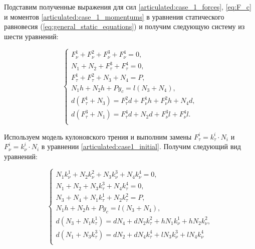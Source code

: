 Подставим полученные выражения для сил \ref{articulated:case_1_forces}, \ref{eq:F_c} и моментов \ref{articulated:case_1_momentums} в уравнения статического равновесия (\ref{eq:general_static_equations}) и получим следующую систему из шести уравнений:

\begin{equation}
  \label{articulated:case1_initial}
  \left\{
    \begin{alignedat}{3}  
      F_\nu^1 + F_\nu^2 + F_\nu^3 + F_\nu^4 = 0, \\
      N_1 + N_2 + F_\tau^3 + F_\tau^4 = 0, \\
      F_\tau^1 + F_\tau^2 + N_3 + N_4 = P, \\
      N_1h + N_2h + Py_c = l(N_3 + N_4), \\
      d(F_\tau^1 + N_3) = F_\tau^2d + F_\nu^1h + F_\nu^2h + N_4d, \\
      d(F_\tau^3 + N_1) = F_\tau^4d + N_2d +F_\nu^3l + F_\nu^4l.\\
    \end{alignedat}
  \right.
\end{equation}

Используем модель кулоновского трения и выполним замены $F_\tau^i = k_\tau^i\cdot N_i$ и $F_\nu^i = k_\nu^i\cdot N_i$ в уравнении \ref{articulated:case1_initial}. Получим следующий вид уравнений:

\begin{equation}
\label{articulated:case1_subs_kulon}
\left\{
  \begin{alignedat}{3}  
    N_1k_\nu^1 + N_2k_\nu^2 + N_3k_\nu^3 + N_4k_\nu^4 = 0,\\
    N_1 + N_2 + N_3k_\tau^3 + N_4k_\tau^4 = 0, \\
    N_3 + N_4 + N_1k_\tau^1 + N_2k_\tau^2 = P, \\
    N_1h + N_2h + Py_c = l(N_3 + N_4), \\
    d(N_3 + N_1k_\tau^1) = dN_4 + dN_2k_\tau^2 + hN_1k_\nu^1 + hN_2k_\nu^2,\\
    d(N_1 + N_3k_\tau^3) = dN_2 + dN_4k_\tau^4 + lN_3k_\nu^3 + lN_4k_\nu^4\\
  \end{alignedat}
\right.
\end{equation}


